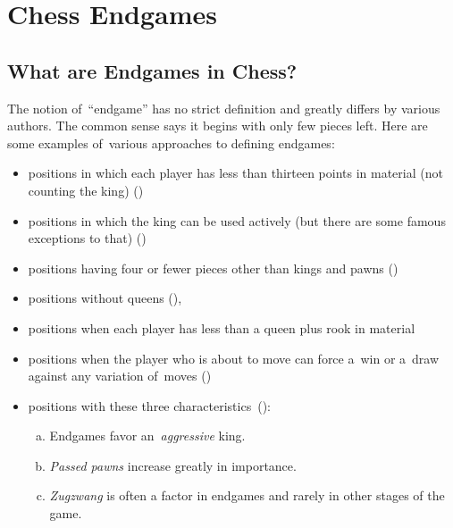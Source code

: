 \chapter{Chess Endgames}
\label{ch:Chess}

\section{What are Endgames in Chess?}
The notion of~``endgame'' has no strict definition and greatly differs by various authors.
The common sense says it begins with only few pieces left.
Here are some examples of~various approaches to defining endgames:
\begin{itemize}
  \item
    positions in which each player has less than thirteen points in material (not counting the king)
    (\cite[pp.~7--8]{Speelman1981endgame})
    
  \item
    positions in which the king can be used actively (but there are some famous exceptions to that)
    (\cite[pp.~7--8]{Speelman1981endgame})
    
  \item
    positions having four or fewer pieces other than kings and pawns
    (\cite[p.~5]{Minev2004practical})
    
  \item
    positions without queens
    (\cite{Fine1952middle}),
    
  \item
    positions when each player has less than a queen plus rook in material
    
  \item
    positions when the player who is about to move can force a~win or a~draw against any variation of~moves
    (\cite{Portisch1981six})

  \item 
    positions with these three characteristics~(\cite{Alburt1999just}):

    \begin{enumerate}[(a)]
      \item Endgames favor an~\emph{aggressive} king.
      \item \emph{Passed pawns}\footnotemark{} increase greatly in importance.
      \item \emph{Zugzwang}\footnotemark{} is often a factor in endgames and rarely in other stages of the game.
    \end{enumerate}


\end{itemize}
